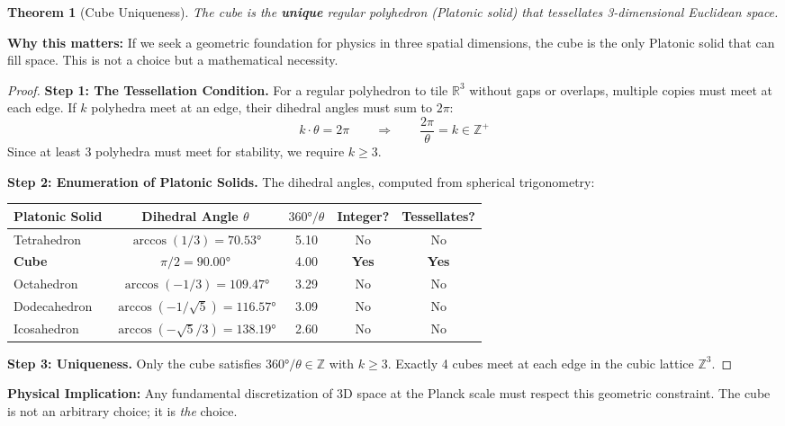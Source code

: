 \documentclass[11pt,a4paper]{article}
\theoremstyle{plain}
\newtheorem{theorem}{Theorem}[section]
\theoremstyle{definition}
\theoremstyle{remark}
\begin{document}
\begin{theorem}[Cube Uniqueness]
The cube is the \textbf{unique} regular polyhedron (Platonic solid) that tessellates 3-dimensional Euclidean space.
\end{theorem}

\textbf{Why this matters:} If we seek a geometric foundation for physics in three spatial dimensions, the cube is the only Platonic solid that can fill space. This is not a choice but a mathematical necessity.

\begin{proof}
\textbf{Step 1: The Tessellation Condition.} For a regular polyhedron to tile $\mathbb{R}^3$ without gaps or overlaps, multiple copies must meet at each edge. If $k$ polyhedra meet at an edge, their dihedral angles must sum to $2\pi$:
\[
k \cdot \theta = 2\pi \qquad \Rightarrow \qquad \frac{2\pi}{\theta} = k \in \mathbb{Z}^+
\]
Since at least 3 polyhedra must meet for stability, we require $k \geq 3$.

\textbf{Step 2: Enumeration of Platonic Solids.} The dihedral angles, computed from spherical trigonometry:

\begin{center}
\begin{tabular}{lcccc}
\toprule
\textbf{Platonic Solid} & \textbf{Dihedral Angle} $\theta$ & $360°/\theta$ & \textbf{Integer?} & \textbf{Tessellates?} \\
\midrule
Tetrahedron & $\arccos(1/3) = 70.53°$ & 5.10 & No & No \\
\textbf{Cube} & $\pi/2 = 90.00°$ & 4.00 & \textbf{Yes} & \textbf{Yes} \\
Octahedron & $\arccos(-1/3) = 109.47°$ & 3.29 & No & No \\
Dodecahedron & $\arccos(-1/\sqrt{5}) = 116.57°$ & 3.09 & No & No \\
Icosahedron & $\arccos(-\sqrt{5}/3) = 138.19°$ & 2.60 & No & No \\
\bottomrule
\end{tabular}
\end{center}

\textbf{Step 3: Uniqueness.} Only the cube satisfies $360°/\theta \in \mathbb{Z}$ with $k \geq 3$. Exactly 4 cubes meet at each edge in the cubic lattice $\mathbb{Z}^3$.
\end{proof}

\textbf{Physical Implication:} Any fundamental discretization of 3D space at the Planck scale must respect this geometric constraint. The cube is not an arbitrary choice; it is \emph{the} choice.
\end{document}
